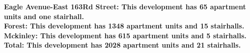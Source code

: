 \bf{Eagle Avenue-East 163Rd Street}: This development has 65 apartment units and one stairhall.\\\bf{Forest}: This development has 1348 apartment units and 15 stairhalls.\\\bf{Mckinley}: This development has 615 apartment units and 5 stairhalls.\\\bf{Total}: This development has 2028 apartment units and 21 stairhalls.\\